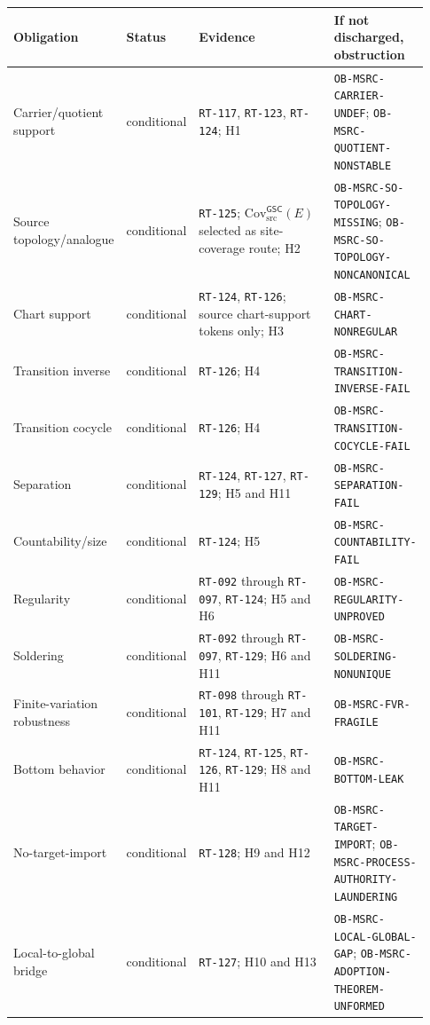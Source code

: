 \documentclass[11pt]{article}
\newcommand{\CovSrc}{\mathrm{Cov}_{\mathrm{src}}^{\mathsf{GSC}}}
\begin{document}
\begin{longtable}{p{0.22\linewidth}p{0.14\linewidth}p{0.37\linewidth}p{0.20\linewidth}}
\toprule
Obligation & Status & Evidence & If not discharged, obstruction \\
\midrule
Carrier/quotient support & conditional &
\texttt{RT-117}, \texttt{RT-123}, \texttt{RT-124}; H1 &
\texttt{OB-MSRC-CARRIER-UNDEF}; \texttt{OB-MSRC-QUOTIENT-NONSTABLE} \\
Source topology/analogue & conditional &
\texttt{RT-125}; \(\CovSrc(E)\) selected as site-coverage route; H2 &
\texttt{OB-MSRC-SO-TOPOLOGY-MISSING}; \texttt{OB-MSRC-SO-TOPOLOGY-NONCANONICAL} \\
Chart support & conditional &
\texttt{RT-124}, \texttt{RT-126}; source chart-support tokens only; H3 &
\texttt{OB-MSRC-CHART-NONREGULAR} \\
Transition inverse & conditional &
\texttt{RT-126}; H4 &
\texttt{OB-MSRC-TRANSITION-INVERSE-FAIL} \\
Transition cocycle & conditional &
\texttt{RT-126}; H4 &
\texttt{OB-MSRC-TRANSITION-COCYCLE-FAIL} \\
Separation & conditional &
\texttt{RT-124}, \texttt{RT-127}, \texttt{RT-129}; H5 and H11 &
\texttt{OB-MSRC-SEPARATION-FAIL} \\
Countability/size & conditional &
\texttt{RT-124}; H5 &
\texttt{OB-MSRC-COUNTABILITY-FAIL} \\
Regularity & conditional &
\texttt{RT-092} through \texttt{RT-097}, \texttt{RT-124}; H5 and H6 &
\texttt{OB-MSRC-REGULARITY-UNPROVED} \\
Soldering & conditional &
\texttt{RT-092} through \texttt{RT-097}, \texttt{RT-129}; H6 and H11 &
\texttt{OB-MSRC-SOLDERING-NONUNIQUE} \\
Finite-variation robustness & conditional &
\texttt{RT-098} through \texttt{RT-101}, \texttt{RT-129}; H7 and H11 &
\texttt{OB-MSRC-FVR-FRAGILE} \\
Bottom behavior & conditional &
\texttt{RT-124}, \texttt{RT-125}, \texttt{RT-126}, \texttt{RT-129}; H8 and H11 &
\texttt{OB-MSRC-BOTTOM-LEAK} \\
No-target-import & conditional &
\texttt{RT-128}; H9 and H12 &
\texttt{OB-MSRC-TARGET-IMPORT}; \texttt{OB-MSRC-PROCESS-AUTHORITY-LAUNDERING} \\
Local-to-global bridge & conditional &
\texttt{RT-127}; H10 and H13 &
\texttt{OB-MSRC-LOCAL-GLOBAL-GAP}; \texttt{OB-MSRC-ADOPTION-THEOREM-UNFORMED} \\
\bottomrule
\end{longtable}
\end{document}
